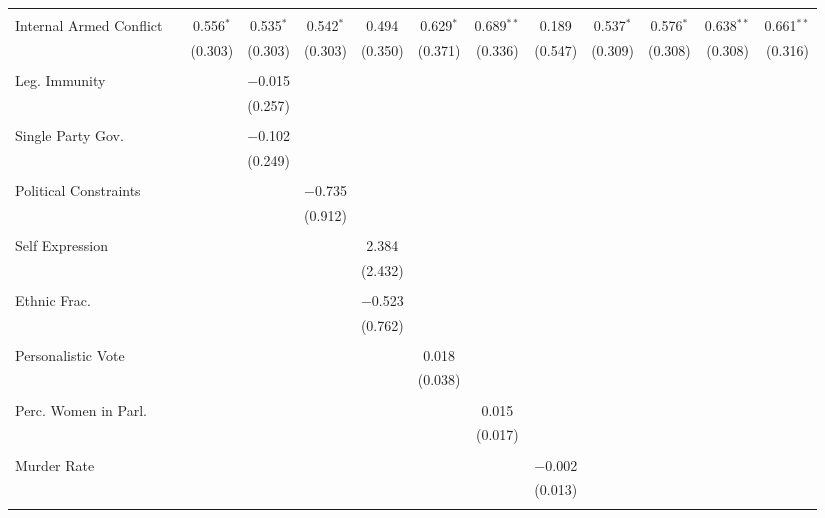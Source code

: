 \documentclass[a4paper]{article}\usepackage[]{graphicx}\usepackage[]{color}
\begin{document}
\begin{table}[H]
\begin{center}
{{\begin{tabular}{@{\extracolsep{5pt}}lcccccccccccc}
  & & & & & & & & & & & & \\ 
 Internal Armed Conflict &  & 0.556$^{*}$ & 0.535$^{*}$ & 0.542$^{*}$ & 0.494 & 0.629$^{*}$ & 0.689$^{**}$ & 0.189 & 0.537$^{*}$ & 0.576$^{*}$ & 0.638$^{**}$ & 0.661$^{**}$ \\ 
  &  & (0.303) & (0.303) & (0.303) & (0.350) & (0.371) & (0.336) & (0.547) & (0.309) & (0.308) & (0.308) & (0.316) \\ 
  & & & & & & & & & & & & \\ 
 Leg. Immunity &  &  & $-$0.015 &  &  &  &  &  &  &  &  &  \\ 
  &  &  & (0.257) &  &  &  &  &  &  &  &  &  \\ 
  & & & & & & & & & & & & \\ 
 Single Party Gov. &  &  & $-$0.102 &  &  &  &  &  &  &  &  &  \\ 
  &  &  & (0.249) &  &  &  &  &  &  &  &  &  \\ 
  & & & & & & & & & & & & \\ 
 Political Constraints &  &  &  & $-$0.735 &  &  &  &  &  &  &  &  \\ 
  &  &  &  & (0.912) &  &  &  &  &  &  &  &  \\ 
  & & & & & & & & & & & & \\ 
 Self Expression &  &  &  &  & 2.384 &  &  &  &  &  &  &  \\ 
  &  &  &  &  & (2.432) &  &  &  &  &  &  &  \\ 
  & & & & & & & & & & & & \\ 
 Ethnic Frac. &  &  &  &  & $-$0.523 &  &  &  &  &  &  &  \\ 
  &  &  &  &  & (0.762) &  &  &  &  &  &  &  \\ 
  & & & & & & & & & & & & \\ 
 Personalistic Vote &  &  &  &  &  & 0.018 &  &  &  &  &  &  \\ 
  &  &  &  &  &  & (0.038) &  &  &  &  &  &  \\ 
  & & & & & & & & & & & & \\ 
 Perc. Women in Parl. &  &  &  &  &  &  & 0.015 &  &  &  &  &  \\ 
  &  &  &  &  &  &  & (0.017) &  &  &  &  &  \\ 
  & & & & & & & & & & & & \\ 
 Murder Rate &  &  &  &  &  &  &  & $-$0.002 &  &  &  &  \\ 
  &  &  &  &  &  &  &  & (0.013) &  &  &  &  \\ 
  & & & & & & & & & & & & \\ 

\end{tabular}}}
\end{center}
\end{table}
\end{document}
